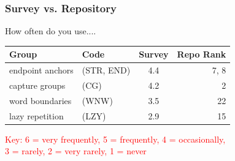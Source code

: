 %
%

\begin{frame}
\frametitle{Survey vs. Repository}

How often do you use.... 

\begin{center}
\begin{tabular}{llcr}
\toprule
\textbf{Group} & \textbf{Code} &  \textbf{Survey} & \textbf{Repo Rank} \\  \hline 
endpoint anchors & (STR, END) & 4.4 & 7, 8\\ \hline 
capture groups & (CG) & 4.2 & 2 \\ \hline 
word boundaries & (WNW) & 3.5 & 22 \\ \hline 
lazy repetition & (LZY) &  2.9 & 15 \\ \hline 
\bottomrule
\end{tabular}

\textcolor{red}{Key: 6 = very frequently, 5 = frequently, 4 = occasionally, \\3 = rarely, 2 = very rarely, 1 = never}
\end{center}

\end{frame}

